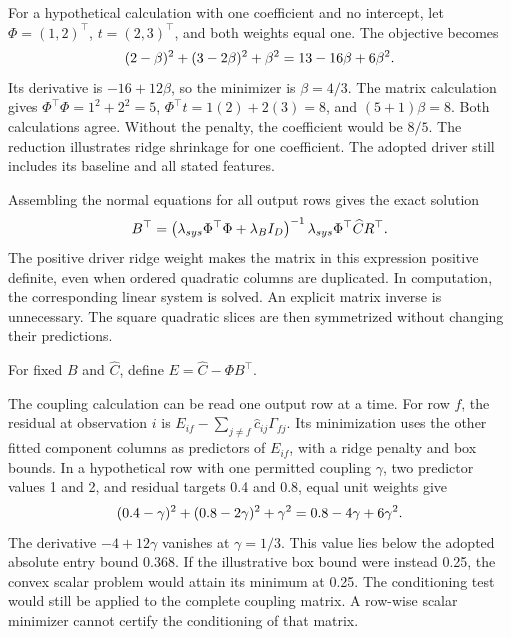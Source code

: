 For a hypothetical calculation with one coefficient and no intercept, let \(\Phi=(1,2)^\top\), \(t=(2,3)^\top\), and both weights equal one. The objective becomes
\begin{equation}
\equationname{Illustrative scalar ridge objective and its polynomial expansion}
\label{eq:icsor_ridge_numeric_example}
(2-\beta)^2+(3-2\beta)^2+\beta^2
=13-16\beta+6\beta^2.
\end{equation}
Its derivative is \(-16+12\beta\), so the minimizer is \(\beta=4/3\). The matrix calculation gives \(\Phi^\top\Phi=1^2+2^2=5\), \(\Phi^\top t=1(2)+2(3)=8\), and \((5+1)\beta=8\). Both calculations agree. Without the penalty, the coefficient would be \(8/5\). The reduction illustrates ridge shrinkage for one coefficient. The adopted driver still includes its baseline and all stated features.

Assembling the normal equations for all output rows gives the exact solution
\begin{equation}
\equationname{Closed-form ridge update for the driver coefficient matrix}
\label{eq:icsor_ridge_update}
B^\top=
\left(\lambda_{sys}\Phi^\top\Phi+\lambda_B I_D\right)^{-1}
\lambda_{sys}\Phi^\top\widehat C R^\top.
\end{equation}
The positive driver ridge weight makes the matrix in this expression positive definite, even when ordered quadratic columns are duplicated. In computation, the corresponding linear system is solved. An explicit matrix inverse is unnecessary. The square quadratic slices are then symmetrized without changing their predictions.

For fixed \(B\) and \(\widehat C\), define \(E=\widehat C-\Phi B^\top\).

The coupling calculation can be read one output row at a time. For row \(f\), the residual at observation \(i\) is \(E_{if}-\sum_{j\neq f}\widehat c_{ij}\Gamma_{fj}\). Its minimization uses the other fitted component columns as predictors of \(E_{if}\), with a ridge penalty and box bounds. In a hypothetical row with one permitted coupling \(\gamma\), two predictor values 1 and 2, and residual targets 0.4 and 0.8, equal unit weights give
\begin{equation}
\equationname{Illustrative scalar coupling objective and its expansion}
\label{eq:icsor_coupling_numeric_update}
(0.4-\gamma)^2+(0.8-2\gamma)^2+\gamma^2
=0.8-4\gamma+6\gamma^2.
\end{equation}
The derivative \(-4+12\gamma\) vanishes at \(\gamma=1/3\). This value lies below the adopted absolute entry bound 0.368. If the illustrative box bound were instead 0.25, the convex scalar problem would attain its minimum at 0.25. The conditioning test would still be applied to the complete coupling matrix. A row-wise scalar minimizer cannot certify the conditioning of that matrix.

